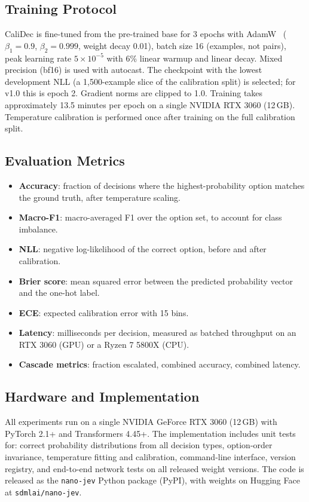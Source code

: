 \documentclass[twocolumn]{ICCKjournal}
\begin{document}
\subsection{Training Protocol}
CaliDec is fine-tuned from the pre-trained base for 3 epochs with AdamW~\cite{loshchilov2019decoupled} ($\beta_1=0.9$, $\beta_2=0.999$, weight decay 0.01), batch size 16 (examples, not pairs), peak learning rate $5 \times 10^{-5}$ with 6\% linear warmup and linear decay. Mixed precision (bf16) is used with autocast. The checkpoint with the lowest development NLL (a 1,500-example slice of the calibration split) is selected; for v1.0 this is epoch 2. Gradient norms are clipped to 1.0. Training takes approximately 13.5 minutes per epoch on a single NVIDIA RTX 3060 (12\,GB). Temperature calibration is performed once after training on the full calibration split.

\subsection{Evaluation Metrics}
\begin{itemize}[leftmargin=*]
    \item \textbf{Accuracy}: fraction of decisions where the highest-probability option matches the ground truth, after temperature scaling.
    \item \textbf{Macro-F1}: macro-averaged F1 over the option set, to account for class imbalance.
    \item \textbf{NLL}: negative log-likelihood of the correct option, before and after calibration.
    \item \textbf{Brier score}: mean squared error between the predicted probability vector and the one-hot label.
    \item \textbf{ECE}: expected calibration error with 15 bins.
    \item \textbf{Latency}: milliseconds per decision, measured as batched throughput on an RTX 3060 (GPU) or a Ryzen 7 5800X (CPU).
    \item \textbf{Cascade metrics}: fraction escalated, combined accuracy, combined latency.
\end{itemize}

\subsection{Hardware and Implementation}
All experiments run on a single NVIDIA GeForce RTX 3060 (12\,GB) with PyTorch 2.1+ and Transformers 4.45+. The implementation includes unit tests for: correct probability distributions from all decision types, option-order invariance, temperature fitting and calibration, command-line interface, version registry, and end-to-end network tests on all released weight versions. The code is released as the \texttt{nano-jev} Python package (PyPI), with weights on Hugging Face at \texttt{sdmlai/nano-jev}.
\end{document}
